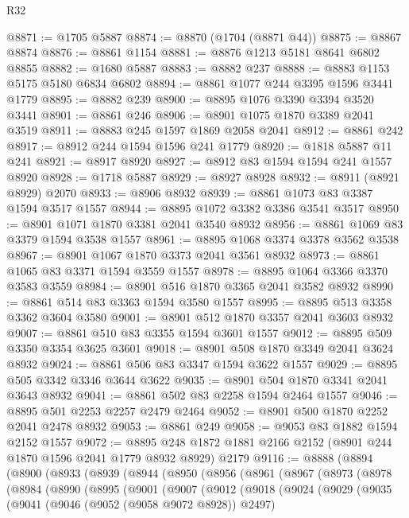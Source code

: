 \begin{lexlean}{R32}
\begin{coremodule}
@8871 := @1705 @5887
@8874 := @8870 (@1704 (@8871 @44))
@8875 := @8867 @8874
@8876 := @8861 @1154
@8881 := @8876 @1213 @5181 @8641 @6802 @8855
@8882 := @1680 @5887
@8883 := @8882 @237
@8888 := @8883 @1153 @5175 @5180 @6834 @6802
@8894 := @8861 @1077 @244 @3395 @1596 @3441 @1779
@8895 := @8882 @239
@8900 := @8895 @1076 @3390 @3394 @3520 @3441
@8901 := @8861 @246
@8906 := @8901 @1075 @1870 @3389 @2041 @3519
@8911 := @8883 @245 @1597 @1869 @2058 @2041
@8912 := @8861 @242
@8917 := @8912 @244 @1594 @1596 @241 @1779
@8920 := @1818 @5887 @11 @241
@8921 := @8917 @8920
@8927 := @8912 @83 @1594 @1594 @241 @1557 @8920
@8928 := @1718 @5887
@8929 := @8927 @8928
@8932 := @8911 (@8921 @8929) @2070
@8933 := @8906 @8932
@8939 := @8861 @1073 @83 @3387 @1594 @3517 @1557
@8944 := @8895 @1072 @3382 @3386 @3541 @3517
@8950 := @8901 @1071 @1870 @3381 @2041 @3540 @8932
@8956 := @8861 @1069 @83 @3379 @1594 @3538 @1557
@8961 := @8895 @1068 @3374 @3378 @3562 @3538
@8967 := @8901 @1067 @1870 @3373 @2041 @3561 @8932
@8973 := @8861 @1065 @83 @3371 @1594 @3559 @1557
@8978 := @8895 @1064 @3366 @3370 @3583 @3559
@8984 := @8901 @516 @1870 @3365 @2041 @3582 @8932
@8990 := @8861 @514 @83 @3363 @1594 @3580 @1557
@8995 := @8895 @513 @3358 @3362 @3604 @3580
@9001 := @8901 @512 @1870 @3357 @2041 @3603 @8932
@9007 := @8861 @510 @83 @3355 @1594 @3601 @1557
@9012 := @8895 @509 @3350 @3354 @3625 @3601
@9018 := @8901 @508 @1870 @3349 @2041 @3624 @8932
@9024 := @8861 @506 @83 @3347 @1594 @3622 @1557
@9029 := @8895 @505 @3342 @3346 @3644 @3622
@9035 := @8901 @504 @1870 @3341 @2041 @3643 @8932
@9041 := @8861 @502 @83 @2258 @1594 @2464 @1557
@9046 := @8895 @501 @2253 @2257 @2479 @2464
@9052 := @8901 @500 @1870 @2252 @2041 @2478 @8932
@9053 := @8861 @249
@9058 := @9053 @83 @1882 @1594 @2152 @1557
@9072 := @8895 @248 @1872 @1881 @2166 @2152 (@8901 @244 @1870 @1596 @2041 @1779 @8932 @8929) @2179
@9116 := @8888
    (@8894
      (@8900
        (@8933
          (@8939
            (@8944
              (@8950
                (@8956
                  (@8961
                    (@8967
                      (@8973
                        (@8978
                          (@8984
                            (@8990
                              (@8995
                                (@9001
                                  (@9007
                                    (@9012
                                      (@9018
                                        (@9024
                                          (@9029
                                            (@9035
                                              (@9041
                                                (@9046 (@9052 (@9058 @9072 @8928)) @2497)

\end{coremodule}
\end{lexlean}
